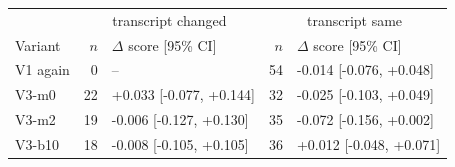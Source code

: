 \begin{tabular}{lrlrl}
\toprule
 & \multicolumn{2}{c}{transcript changed} & \multicolumn{2}{c}{transcript same} \\
Variant & $n$ & $\Delta$ score [95\% CI] & $n$ & $\Delta$ score [95\% CI] \\
\midrule
V1 again & 0 & -- & 54 & -0.014 [-0.076, +0.048] \\
V3-m0 & 22 & +0.033 [-0.077, +0.144] & 32 & -0.025 [-0.103, +0.049] \\
V3-m2 & 19 & -0.006 [-0.127, +0.130] & 35 & -0.072 [-0.156, +0.002] \\
V3-b10 & 18 & -0.008 [-0.105, +0.105] & 36 & +0.012 [-0.048, +0.071] \\
\bottomrule
\end{tabular}
